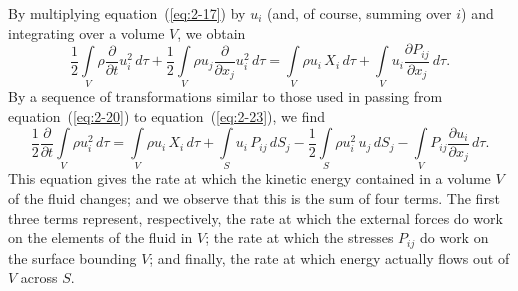 By multiplying equation~(\ref{eq:2-17}) by $u_i$ (and, of course, summing over $i$)
and integrating over a volume $V$, we obtain
\begin{equation}
\label{eq:2-24}
\frac{1}{2}\int\limits_V \rho\frac{\partial}{\partial t}u_i^2\,d\tau + \frac{1}{2}\int\limits_V \rho u_j\frac{\partial}{\partial x_j}u_i^2\,d\tau = \int\limits_V \rho u_i\,X_i\,d\tau + \int\limits_V u_i\frac{\partial P_{ij}}{\partial x_j}\,d\tau.
\end{equation}
By a sequence of transformations similar to those used in passing from
equation~(\ref{eq:2-20}) to equation~(\ref{eq:2-23}), we find
\begin{equation}
\label{eq:2-25}
\frac{1}{2}\frac{\partial}{\partial t}\int\limits_V \rho u_i^2\,d\tau = \int\limits_V \rho u_i\,X_i\,d\tau + \int\limits_S u_i\,P_{ij}\,dS_j - \frac{1}{2}\int\limits_S \rho u_i^2\,u_j\,dS_j - \int\limits_V P_{ij}\frac{\partial u_i}{\partial x_j}\,d\tau.
\end{equation}
This equation gives the rate at which the kinetic energy contained in a
volume $V$ of the fluid changes; and we observe that this is the sum of
four terms. The first three terms represent, respectively, the rate at
which the external forces do work on the elements of the fluid in $V$; the
rate at which the stresses $P_{ij}$ do work on the surface bounding $V$; and
finally, the rate at which energy actually flows out of $V$ across $S$.

